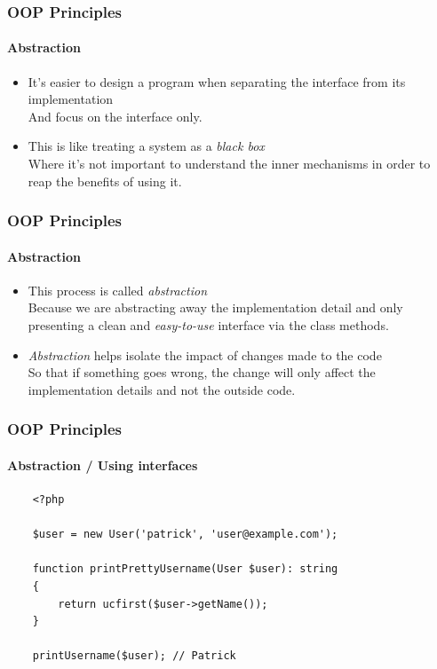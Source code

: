 \begin{frame}
    \frametitle{OOP Principles}
    \framesubtitle{Abstraction}

    \begin{itemize}
        \item It’s easier to design a program when separating the interface from its implementation\pause
              \\\textcolor{ecgrey!50}{And focus on the interface only.}
        \pause
        \item This is like treating a system as a \textit{black box}\pause
              \\\textcolor{ecgrey!50}{Where it’s not important to understand the inner mechanisms in order to reap the benefits of using it.}
    \end{itemize}
\end{frame}

\begin{frame}
    \frametitle{OOP Principles}
    \framesubtitle{Abstraction}

    \begin{itemize}
        \item This process is called \textit{abstraction}\pause
              \\\textcolor{ecgrey!50}{Because we are abstracting away the implementation detail and only presenting a clean and \textit{easy-to-use} interface via the class methods.}
        \pause
        \item \textit{Abstraction} helps isolate the impact of changes made to the code\pause
              \\\textcolor{ecgrey!50}{So that if something goes wrong, the change will only affect the implementation details and not the outside code.}
    \end{itemize}
\end{frame}

\begin{frame}[fragile,c]
    \frametitle{OOP Principles}
    \framesubtitle{Abstraction / Using interfaces}

    \begin{lstlisting}
    <?php

    $user = new User('patrick', 'user@example.com');

    function printPrettyUsername(User $user): string
    {
        return ucfirst($user->getName());
    }

    printUsername($user); // Patrick
    \end{lstlisting}
\end{frame}

